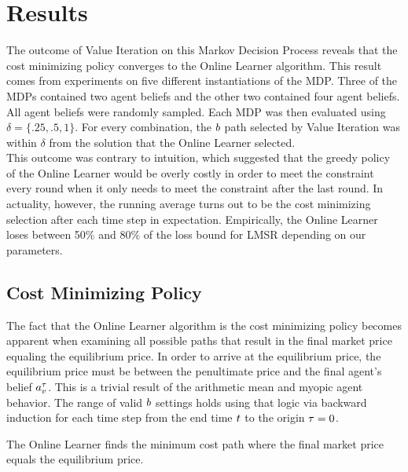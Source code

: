 \section{Results}
The outcome of Value Iteration on this Markov Decision Process reveals that the cost minimizing policy converges to the Online Learner algorithm. This result comes from experiments on five different instantiations of the MDP. Three of the MDPs contained two agent beliefs and the other two contained four agent beliefs. All agent beliefs were randomly sampled. Each MDP was then evaluated using $\delta = \{.25,.5,1\}$. For every combination, the $b$ path selected by Value Iteration was within $\delta$ from the solution that the Online Learner selected.\\

This outcome was contrary to intuition, which suggested that the greedy policy of the Online Learner would be overly costly in order to meet the constraint every round when it only needs to meet the constraint after the last round. In actuality, however, the running average turns out to be the cost minimizing selection after each time step in expectation. Empirically, the Online Learner loses between 50\% and 80\% of the loss bound for LMSR depending on our parameters. \\

\subsection{Cost Minimizing Policy}
The fact that the Online Learner algorithm is the cost minimizing policy becomes apparent when examining all possible paths that result in the final market price equaling the equilibrium price. In order to arrive at the equilibrium price, the equilibrium price must be between the penultimate price and the final agent's belief $a^{\tau}_v$. This is a trivial result of the arithmetic mean and myopic agent behavior. The range of valid $b$ settings holds using that logic via backward induction for each time step from the end time $t$ to the origin $\tau=0$. \\

\begin{conjecture}
The Online Learner finds the minimum cost path where the final market price equals the equilibrium price.
\end{conjecture}


